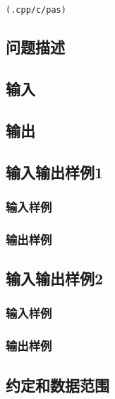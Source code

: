 \documentclass[UTF8]{ctexart}
\begin{document}
\newpage
\section{}
\begin{center}
\tt\large{(.cpp/c/pas)}
\end{center}
\subsection{问题描述}

\subsection{输入}
\subsection{输出}

\subsection{输入输出样例1}
\subsubsection{输入样例}
\subsubsection{输出样例}

\subsection{输入输出样例2}
\subsubsection{输入样例}
\subsubsection{输出样例}


\subsection{约定和数据范围}
\end{document}

